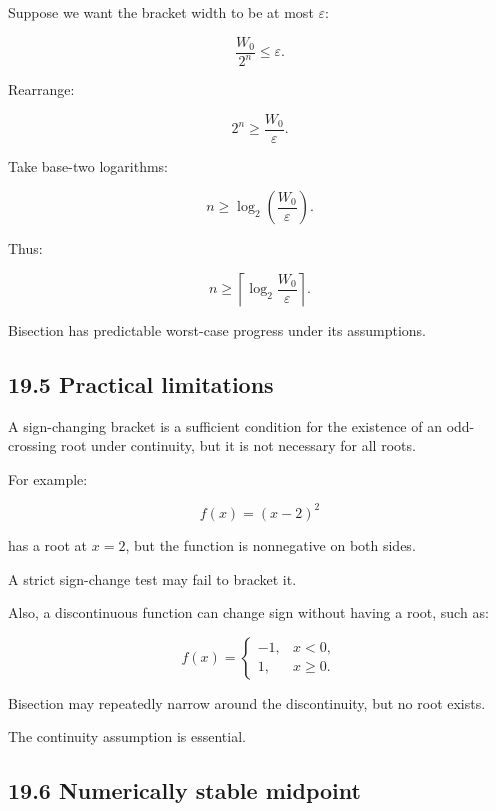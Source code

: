 \hypertarget{02-foundations-ii-ch028-how-many-iterations}{}

Suppose we want the bracket width to be at most \(\varepsilon\):

\[ \frac{W_0}{2^n}\le\varepsilon. \]

Rearrange:

\[ 2^n\ge\frac{W_0}{\varepsilon}. \]

Take base-two logarithms:

\[ n\ge \log_2\left(\frac{W_0}{\varepsilon}\right). \]

Thus:

\[ \boxed{ n\ge \left\lceil \log_2\frac{W_0}{\varepsilon} \right\rceil }. \]

Bisection has predictable worst-case progress under its assumptions.

\subsection{19.5 Practical limitations}\label{02-foundations-ii-ch028-practical-limitations}

\hypertarget{02-foundations-ii-ch028-practical-limitations}{}

A sign-changing bracket is a sufficient condition for the existence of an odd-crossing root under continuity, but it is not necessary for all roots.

For example:

\[ f(x)=(x-2)^2 \]

has a root at \(x=2\), but the function is nonnegative on both sides.

A strict sign-change test may fail to bracket it.

Also, a discontinuous function can change sign without having a root, such as:

\[ f(x)= \begin{cases} -1,&x<0,\\ 1,&x\ge0. \end{cases} \]

Bisection may repeatedly narrow around the discontinuity, but no root exists.

The continuity assumption is essential.

\subsection{19.6 Numerically stable midpoint}\label{02-foundations-ii-ch028-numerically-stable-midpoint}

